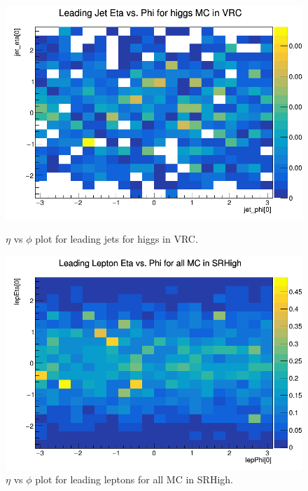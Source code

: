\begin{figure}[htbp]
\centering
\begin{minipage}{0.45\textwidth}
    \includegraphics[width=\textwidth]{Images/SUSY/jet_eta_phi_higgs_VRC.png}
    \caption{$\eta$ vs $\phi$ plot for leading jets for higgs in VRC.}
\end{minipage}
\hfill
\begin{minipage}{0.45\textwidth}
    \includegraphics[width=\textwidth]{Images/SUSY/lep_eta_phi_all_MC_SRHigh.png}
    \caption{$\eta$ vs $\phi$ plot for leading leptons for all MC in SRHigh.}
\end{minipage}
\end{figure}

